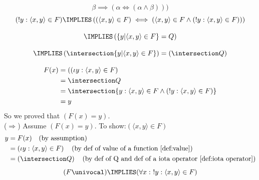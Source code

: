 \[
\beta\implies(\alpha\iff(\alpha \land \beta)))
\]
\[
(!y: \langle x,y\rangle\in F)
\IMPLIES
\left(
(\langle x,y\rangle\in F)
\iff
(\langle x,y\rangle\in F \land (!y: \langle x,y\rangle\in F))
\right)
\]

\[
\IMPLIES
\left(
\{y| \langle x,y\rangle\in F\}
=
Q
\right)
\]


\[
\IMPLIES
\left(\intersection\{y| \langle x,y\rangle\in F\}\right)=
\left(\intersection
Q
\right)
\]

\begin{align*}
F(x)&=\left((\iota y: \langle x,y\rangle\in F\right)\\
&=\intersection Q\\
&=\intersection \{y: \langle x,y\rangle\in F\land (!y:\langle x,y\rangle\in F)\}\\
&=y
\end{align*}
So we proved that $(F(x)=y)$.\\
\noindent($\Rightarrow$) Assume $(F(x)=y)$. To show:$(\langle x,y\rangle\in F)$
\begin{align*}
y&=F(x)
\quad(\mbox{by assumption}) \\
&=\left(\iota y: \langle x,y\rangle\in F\right)
\quad(\mbox{by def of value of a function \ref{def:value}})
\\
&=\left(\intersection Q\right)
\quad(\mbox{by def of Q and def of a iota operator \ref{def:iota operator}})
\end{align*}
\[
(F\univocal)
\IMPLIES
(\forall x:\ !y : \langle x,y\rangle \in F)
\]

